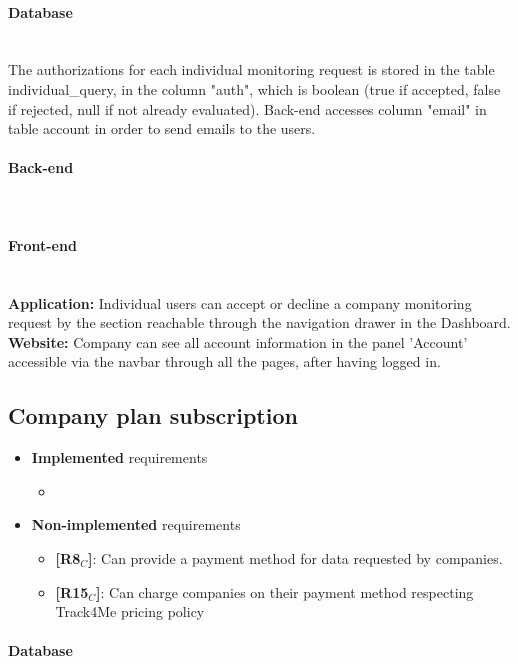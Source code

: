 \paragraph{Database} \mbox{}\\
The authorizations for each individual monitoring request is stored in the table individual\_query, in the column "auth", which is boolean (true if accepted, false if rejected, null if not already evaluated).
Back-end accesses column "email" in table account in order to send emails to the users.


\paragraph{Back-end} \mbox{}\\  \paragraph{Front-end} \mbox{}\\
\textbf{Application:} Individual users can accept or decline a company monitoring request by the section reachable through the navigation drawer in the Dashboard.\\
\textbf{Website:} Company can see all account information in the panel 'Account' accessible via the navbar through all the pages, after having logged in.\\

\subsection{Company plan subscription }
\begin{itemize}
    \item \textbf{Implemented} requirements
        \begin{itemize}
            \item 
        \end{itemize}
    \item \textbf{Non-implemented} requirements
    \begin{itemize}
    \item \textbf{[R8$_C$]}: Can provide a payment method for data requested by companies.
    \item \textbf{[R15$_C$]}: Can charge companies on their payment method respecting Track4Me pricing policy
        \end{itemize}
\end{itemize}

\paragraph{Database} \mbox{}\\ 
